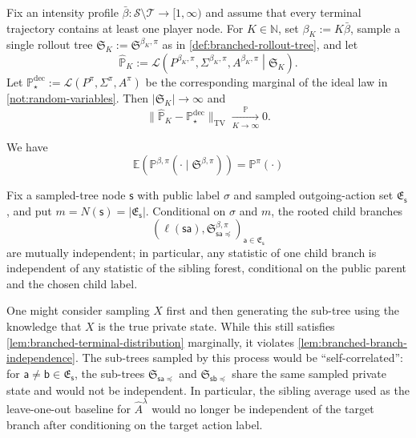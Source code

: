 \documentclass[12pt, a4paper]{article}
\begin{document}
\begin{lemma}\label{lem:branched-decision-law-convergence}
Fix an intensity profile $\bar\beta:\mathcal S\setminus\mathcal T\to[1,\infty)$ and assume that every terminal trajectory contains at least one player node.
For $K\in\mathbb N$, set $\beta_K:=K\bar\beta$, sample a single rollout tree $\mathfrak S_K:=\mathfrak S^{\beta_K,\pi}$ as in \cref{def:branched-rollout-tree}, and let
\[
  \widehat{\mathbb P}_K
  :=
  \mathcal L\!\left(
    P^{\beta_K,\pi},\Sigma^{\beta_K,\pi},A^{\beta_K,\pi}
    \middle|
    \mathfrak S_K
  \right).
\]
Let $\mathbb P_\star^{\mathrm{dec}}:=\mathcal L(P^\pi,\Sigma^\pi,A^\pi)$ be the corresponding marginal of the ideal law in \autoref{not:random-variables}.
Then $|\mathfrak S_K|\to\infty$ and
\[
  \bigl\|\widehat{\mathbb P}_K-\mathbb P_\star^{\mathrm{dec}}\bigr\|_{\mathrm{TV}}
  \xrightarrow[K\to\infty]{\mathbb P}
  0.
\]
\end{lemma}

\begin{lemma}\label{lem:branched-terminal-distribution}
    We have
    \begin{equation}\label{eq:branched-terminal-distribution}
        \mathbb{E}(\mathbb{P}^{\beta, \pi}(\cdot \mid \mathfrak{S}^{\beta, \pi})) = \mathbb{P}^\pi(\cdot)
    \end{equation}
\end{lemma}

\begin{lemma}\label{lem:branched-branch-independence}
    Fix a sampled-tree node $\mathsf{s}$ with public label $\sigma$ and sampled outgoing-action set $\mathfrak{E}_{\mathsf{s}}$, and put $m=N(\mathsf{s})=|\mathfrak{E}_{\mathsf{s}}|$.
    Conditional on $\sigma$ and $m$, the rooted child branches
    \[
        \left(\ell(\mathsf{s}\mathsf{a}),\mathfrak{S}_{\mathsf{s}\mathsf{a}\preccurlyeq}^{\beta,\pi}\right)_{\mathsf{a}\in\mathfrak{E}_{\mathsf{s}}}
    \]
    are mutually independent; in particular, any statistic of one child branch is independent of any statistic of the sibling forest, conditional on the public parent and the chosen child label.
\end{lemma}

\begin{warning}\label{warn:no-private-tilting}
    One might consider sampling $X$ first and then generating the sub-tree using the knowledge that $X$ is the true private state.
    While this still satisfies \autoref{lem:branched-terminal-distribution} marginally, it violates \autoref{lem:branched-branch-independence}.
    The sub-trees sampled by this process would be ``self-correlated'': for $\mathsf{a}\neq\mathsf{b}\in \mathfrak{E}_{\mathsf{s}}$, the sub-trees $\mathfrak{S}_{\mathsf{s}\mathsf{a} \preccurlyeq}$ and $\mathfrak{S}_{\mathsf{s}\mathsf{b} \preccurlyeq}$ share the same sampled private state and would not be independent.
    In particular, the sibling average used as the leave-one-out baseline for $\widehat{A}^\lambda$ would no longer be independent of the target branch after conditioning on the target action label.
\end{warning}
\end{document}
